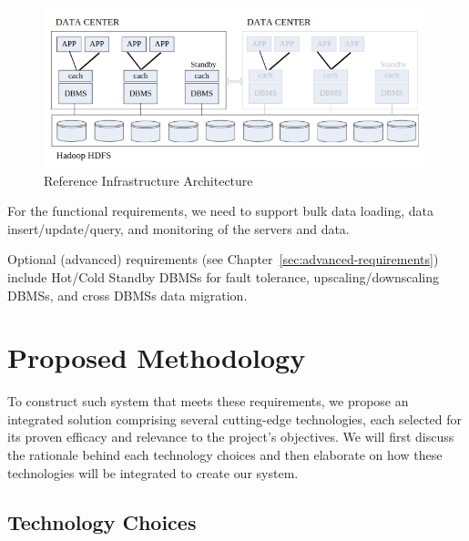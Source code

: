 \documentclass{report}
\begin{document}
    \begin{figure}[h]
        \centering
        \includegraphics[width=\textwidth]{images/reference-architecture}
        \caption{Reference Infrastructure Architecture}
        \label{fig:reference-infrastructure-architecture}
    \end{figure}

    For the functional requirements, we need to support bulk data loading, data insert/update/query, and monitoring of the servers and data.

    Optional (advanced) requirements (see Chapter~\ref{sec:advanced-requirements}) include Hot/Cold Standby DBMSs for fault tolerance, upscaling/downscaling DBMSs, and cross DBMSs data migration.

    \section{Proposed Methodology}
    To construct such system that meets these requirements, we propose an integrated solution comprising several cutting-edge technologies, each selected for its proven efficacy and relevance to the project's objectives. We will first discuss the rationale behind each technology choices and then elaborate on how these technologies will be integrated to create our system.

    \subsection{Technology Choices}
\end{document}
